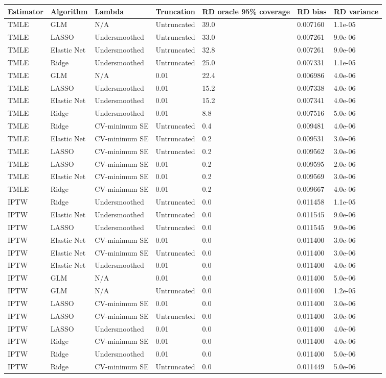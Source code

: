 
\begin{longtable}[l]{lllllll}
\toprule
Estimator & Algorithm & Lambda & Truncation & RD oracle 95\% coverage & RD bias & RD variance\\
\midrule
TMLE & GLM & N/A & Untruncated & 39.0 & 0.007160 & 1.1e-05\\
TMLE & LASSO & Undersmoothed & Untruncated & 33.0 & 0.007261 & 9.0e-06\\
TMLE & Elastic Net & Undersmoothed & Untruncated & 32.8 & 0.007261 & 9.0e-06\\
TMLE & Ridge & Undersmoothed & Untruncated & 25.0 & 0.007331 & 1.1e-05\\
TMLE & GLM & N/A & 0.01 & 22.4 & 0.006986 & 4.0e-06\\
TMLE & LASSO & Undersmoothed & 0.01 & 15.2 & 0.007338 & 4.0e-06\\
TMLE & Elastic Net & Undersmoothed & 0.01 & 15.2 & 0.007341 & 4.0e-06\\
TMLE & Ridge & Undersmoothed & 0.01 & 8.8 & 0.007516 & 5.0e-06\\
TMLE & Ridge & CV-minimum SE & Untruncated & 0.4 & 0.009481 & 4.0e-06\\
TMLE & Elastic Net & CV-minimum SE & Untruncated & 0.2 & 0.009531 & 3.0e-06\\
TMLE & LASSO & CV-minimum SE & Untruncated & 0.2 & 0.009562 & 3.0e-06\\
TMLE & LASSO & CV-minimum SE & 0.01 & 0.2 & 0.009595 & 2.0e-06\\
TMLE & Elastic Net & CV-minimum SE & 0.01 & 0.2 & 0.009569 & 3.0e-06\\
TMLE & Ridge & CV-minimum SE & 0.01 & 0.2 & 0.009667 & 4.0e-06\\
IPTW & Ridge & Undersmoothed & Untruncated & 0.0 & 0.011458 & 1.1e-05\\
IPTW & Elastic Net & Undersmoothed & Untruncated & 0.0 & 0.011545 & 9.0e-06\\
IPTW & LASSO & Undersmoothed & Untruncated & 0.0 & 0.011545 & 9.0e-06\\
IPTW & Elastic Net & CV-minimum SE & 0.01 & 0.0 & 0.011400 & 3.0e-06\\
IPTW & Elastic Net & CV-minimum SE & Untruncated & 0.0 & 0.011400 & 3.0e-06\\
IPTW & Elastic Net & Undersmoothed & 0.01 & 0.0 & 0.011400 & 4.0e-06\\
IPTW & GLM & N/A & 0.01 & 0.0 & 0.011400 & 5.0e-06\\
IPTW & GLM & N/A & Untruncated & 0.0 & 0.011400 & 1.2e-05\\
IPTW & LASSO & CV-minimum SE & 0.01 & 0.0 & 0.011400 & 3.0e-06\\
IPTW & LASSO & CV-minimum SE & Untruncated & 0.0 & 0.011400 & 3.0e-06\\
IPTW & LASSO & Undersmoothed & 0.01 & 0.0 & 0.011400 & 4.0e-06\\
IPTW & Ridge & CV-minimum SE & 0.01 & 0.0 & 0.011400 & 4.0e-06\\
IPTW & Ridge & Undersmoothed & 0.01 & 0.0 & 0.011400 & 5.0e-06\\
IPTW & Ridge & CV-minimum SE & Untruncated & 0.0 & 0.011449 & 5.0e-06\\
\bottomrule
\end{longtable}
